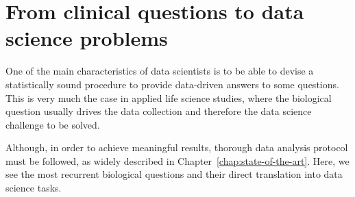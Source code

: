 



%
%

\section{From clinical questions to data science problems} \label{sec:clinical_to_data}
One of the main characteristics of data scientists is to be able to devise a statistically sound procedure to provide data-driven answers to some questions. This is very much the case in applied life science studies, where the biological question usually drives the data collection and therefore the data science challenge to be solved.

Although, in order to achieve meaningful results, thorough data analysis protocol must be followed, as widely described in Chapter~\ref{chap:state-of-the-art}.
Here, we see the most recurrent biological questions and their direct translation into data science tasks.

